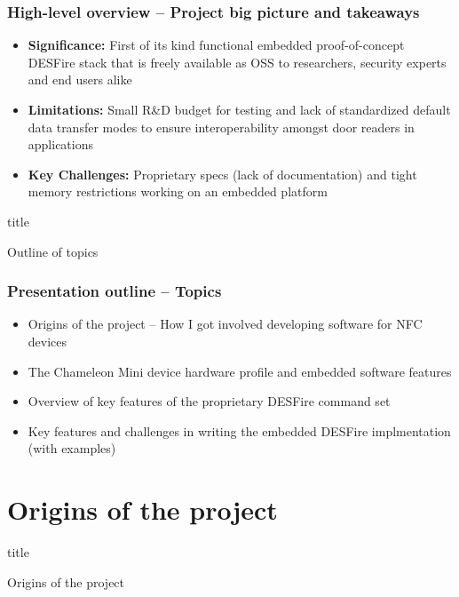 \documentclass[usenames,svgnames,dvipsnames,11pt]{beamer}
\newcommand{\TitleBoxed}[1]{
     \begin{beamercolorbox}[sep=8pt,center,shadow=true,rounded=true]{title}
          \usebeamerfont{title}#1\par%
     \end{beamercolorbox}
}
\begin{document}
\begin{frame}
\frametitle{High-level overview -- Project big picture and takeaways}

\begin{itemize} 

\item \textbf{Significance:} First of its kind functional embedded proof-of-concept 
      DESFire stack that is freely available as 
      OSS to researchers, security experts and end users alike
\item \textbf{Limitations:} Small R\&D budget for testing and lack of standardized default 
      data transfer modes to ensure interoperability amongst door readers in applications 
\item \textbf{Key Challenges:} Proprietary specs (lack of documentation) 
      and tight memory restrictions working on an 
      embedded platform 

\end{itemize} 

\end{frame}

\begin{frame}
\TitleBoxed{
     \Huge{\centerline{Outline of topics}}
}
\end{frame}

\begin{frame}
\frametitle{Presentation outline -- Topics}
\begin{itemize} 

\item Origins of the project -- How I got involved developing software for NFC devices 
\item The Chameleon Mini device hardware profile and embedded software features
\item Overview of key features of the proprietary DESFire command set 
\item Key features and challenges in writing the embedded DESFire implmentation (with examples)

\end{itemize} 

\end{frame}

\section{Origins of the project}

\begin{frame}
\TitleBoxed{
     \Huge{\centerline{Origins of the project}}
}
\end{frame}
\end{document}

